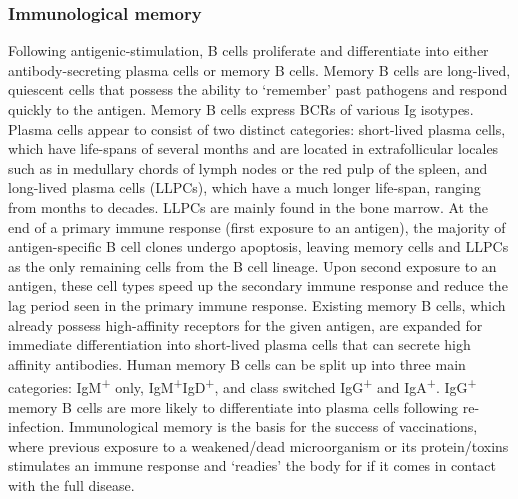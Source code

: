 \subsubsection{Immunological memory}
Following antigenic-stimulation, B cells proliferate and differentiate into either antibody-secreting plasma cells or memory B cells.
Memory B cells are long-lived, quiescent cells that possess the ability to `remember' past pathogens and respond quickly to the antigen\cite{palm2019remembrance}.
Memory B cells express BCRs of various Ig isotypes.
Plasma cells appear to consist of two distinct categories: short-lived plasma cells, which have life-spans of several months and are located in extrafollicular locales such as in medullary chords of lymph nodes or the red pulp of the spleen, and long-lived plasma cells (LLPCs), which have a much longer life-span, ranging from months to decades\cite{bortnick2013and, andraud2012living}.
LLPCs are mainly found in the bone marrow\cite{bortnick2013and, andraud2012living}.
At the end of a primary immune response (first exposure to an antigen), the majority of antigen-specific B cell clones undergo apoptosis, leaving memory cells and LLPCs as the only remaining cells from the B cell lineage.
Upon second exposure to an antigen, these cell types speed up the secondary immune response and reduce the lag period seen in the primary immune response.
Existing memory B cells, which already possess high-affinity receptors for the given antigen, are expanded for immediate differentiation into short-lived plasma cells that can secrete high affinity antibodies.
Human memory B cells can be split up into three main categories: IgM\textsuperscript{+} only, IgM\textsuperscript{+}IgD\textsuperscript{+}, and class switched IgG\textsuperscript{+} and IgA\textsuperscript{+}\cite{palm2019remembrance}.
IgG\textsuperscript{+} memory B cells are more likely to differentiate into plasma cells following re-infection.
Immunological memory is the basis for the success of vaccinations, where previous exposure to a weakened/dead microorganism or its protein/toxins stimulates an immune response and `readies' the body for if it comes in contact with the full disease.

